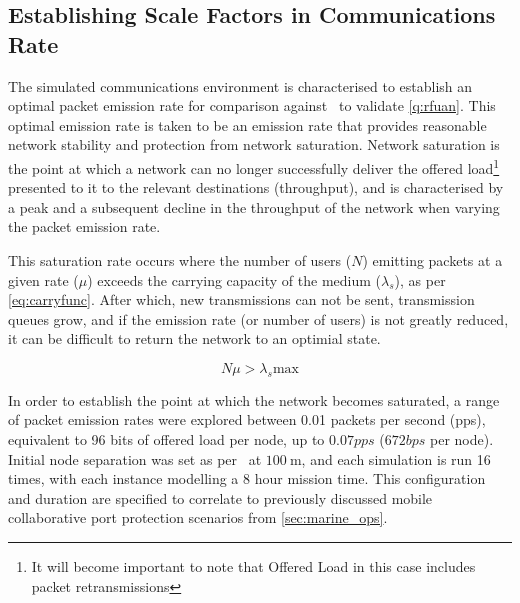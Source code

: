 \subsection{Establishing Scale Factors in Communications Rate}

The simulated communications environment is characterised to establish an optimal packet emission rate for comparison against~\cite{Guo11} to validate \autoref{q:rfuan}.
This optimal emission rate is taken to be an emission rate that provides reasonable network stability and protection from network saturation.
Network saturation is the point at which a network can no longer successfully deliver the offered load\footnote{It will become important to note that Offered Load in this case includes packet retransmissions} presented to it to the relevant destinations (throughput), and is characterised by a peak and a subsequent decline in the throughput of the network when varying the packet emission rate. 

This saturation rate occurs where the number of users ($N$) emitting packets at a given rate ($\mu$) exceeds the carrying capacity of the medium ($\lambda_s$), as per \autoref{eq:carryfunc}. 
After which, new transmissions can not be sent, transmission queues grow, and if the emission rate (or number of users) is not greatly reduced, it can be difficult to return the network to an optimial state.

\begin{equation}
N\mu>\lambda_s\text{max}\label{eq:carryfunc}
\end{equation}


In order to establish the point at which the network becomes saturated, a range of packet emission rates were explored between 0.01 packets per second (pps), equivalent to 96 bits of offered load per node, up to $0.07 pps$ ($672 bps$ per node).
Initial node separation was set as per~\citet{Guo11} at $\SI{100}{\meter}$, and each simulation is run 16 times, with each instance modelling a 8 hour mission time.
This configuration and duration are specified to correlate to previously discussed mobile collaborative port protection scenarios from \autoref{sec:marine_ops}.

